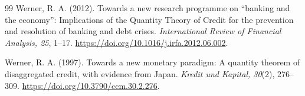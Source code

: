 \documentclass[11pt]{article}
\begin{document}
\begin{thebibliography}{99}
Werner, R. A. (2012).
Towards a new research programme on ``banking and the economy'': Implications
of the Quantity Theory of Credit for the prevention and resolution of banking
and debt crises.
\emph{International Review of Financial Analysis, 25}, 1--17.
\url{https://doi.org/10.1016/j.irfa.2012.06.002}.

Werner, R. A. (1997).
Towards a new monetary paradigm: A quantity theorem of disaggregated credit,
with evidence from Japan.
\emph{Kredit und Kapital, 30}(2), 276--309.
\url{https://doi.org/10.3790/ccm.30.2.276}.

\end{thebibliography}
\end{document}
